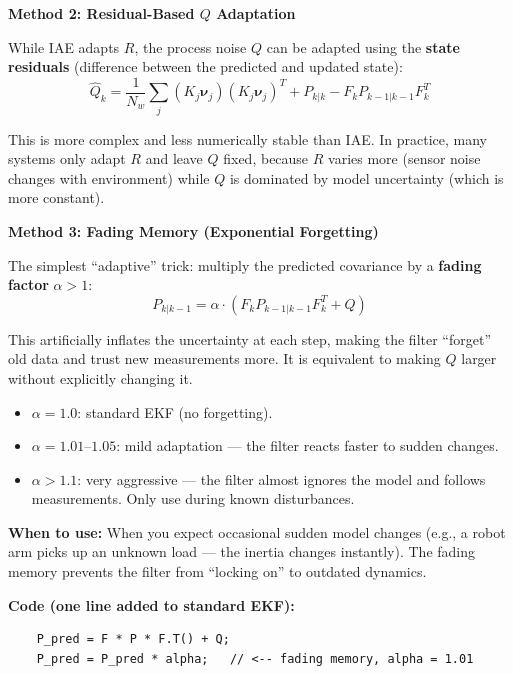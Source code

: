 \textbf{Method 2: Residual-Based $Q$ Adaptation}

While IAE adapts $R$, the process noise $Q$ can be adapted using the \textbf{state residuals} (difference between the predicted and updated state):
\begin{equation}
\hat{Q}_k = \frac{1}{N_w} \sum_{j} (K_j \boldsymbol{\nu}_j)(K_j \boldsymbol{\nu}_j)^T + P_{k|k} - F_k P_{k-1|k-1} F_k^T
\end{equation}

This is more complex and less numerically stable than IAE. In practice, many systems only adapt $R$ and leave $Q$ fixed, because $R$ varies more (sensor noise changes with environment) while $Q$ is dominated by model uncertainty (which is more constant).

\textbf{Method 3: Fading Memory (Exponential Forgetting)}

The simplest ``adaptive'' trick: multiply the predicted covariance by a \textbf{fading factor} $\alpha > 1$:
\begin{equation}
P_{k|k-1} = \alpha \cdot (F_k P_{k-1|k-1} F_k^T + Q)
\end{equation}

This artificially inflates the uncertainty at each step, making the filter ``forget'' old data and trust new measurements more. It is equivalent to making $Q$ larger without explicitly changing it.

\begin{itemize}
    \item $\alpha = 1.0$: standard EKF (no forgetting).
    \item $\alpha = 1.01$--$1.05$: mild adaptation --- the filter reacts faster to sudden changes.
    \item $\alpha > 1.1$: very aggressive --- the filter almost ignores the model and follows measurements. Only use during known disturbances.
\end{itemize}

\textbf{When to use:} When you expect occasional sudden model changes (e.g., a robot arm picks up an unknown load --- the inertia changes instantly). The fading memory prevents the filter from ``locking on'' to outdated dynamics.

\textbf{Code (one line added to standard EKF):}
\begin{verbatim}
    P_pred = F * P * F.T() + Q;
    P_pred = P_pred * alpha;   // <-- fading memory, alpha = 1.01
\end{verbatim}


